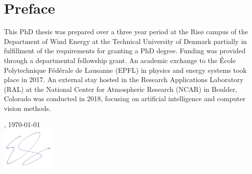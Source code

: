 \chapter{Preface}
\label{sec:preface}


This PhD thesis was prepared over a three year period at the Ris{\o} campus of the Department of Wind Energy at the Technical University of Denmark partially in fulfillment of the requirements for granting a PhD degree. Funding was provided through a departmental fellowship grant. An academic exchange to the {\'E}cole Polytechnique F{\'e}d{\'e}rale de Lausanne (EPFL) in physics and energy systems took place in 2017. An external stay hosted in the Research Applications Laboratory (RAL) at the National Center for Atmospheric Research (NCAR) in Boulder, Colorado was conducted in 2018, focusing on artificial intelligence and computer vision methods.

\vfill

{
\flushright
    \thesislocation{}, \today\\[1cm]
    \hspace{3cm}\includegraphics[width=0.2\textwidth]{graphics/signature.png}\\[1cm]
\begin{flushright}
    \thesisauthor{}
\end{flushright}
}
